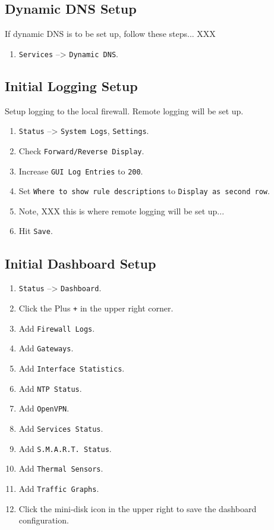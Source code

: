 \subsection{Dynamic DNS Setup}
If dynamic DNS is to be set up, follow these steps... XXX
\begin{enumerate}
 \item \texttt{Services} --> \texttt{Dynamic DNS}.
\end{enumerate}

\subsection{Initial Logging Setup}
Setup logging to the local firewall. Remote logging will be set up.

\begin{enumerate}
 \item \texttt{Status} --> \texttt{System Logs}, \texttt{Settings}.
 \item Check \texttt{Forward/Reverse Display}.
 \item Increase \texttt{GUI Log Entries} to \texttt{200}.
 \item Set \texttt{Where to show rule descriptions} to \texttt{Display as second row}.
 \item Note, XXX this is where remote logging will be set up... 
 \item Hit \texttt{Save}.
\end{enumerate}

\subsection{Initial Dashboard Setup}

\begin{enumerate}
 \item \texttt{Status} --> \texttt{Dashboard}.
 \item Click the Plus \texttt{+} in the upper right corner.
 \item Add \texttt{Firewall Logs}.
 \item Add \texttt{Gateways}.
 \item Add \texttt{Interface Statistics}.
 \item Add \texttt{NTP Status}.
 \item Add \texttt{OpenVPN}.
 \item Add \texttt{Services Status}.
 \item Add \texttt{S.M.A.R.T. Status}.
 \item Add \texttt{Thermal Sensors}.
 \item Add \texttt{Traffic Graphs}.
 \item Click the mini-disk icon in the upper right to save the dashboard configuration.
\end{enumerate}

